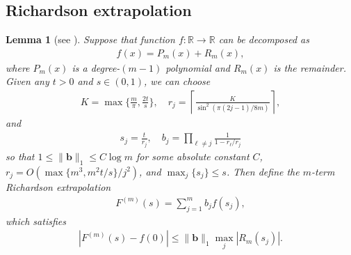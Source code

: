 \documentclass[11pt]{article}
\newtheorem{lemma}{Lemma}
\newcommand{\mb}{\mathbb}
\begin{document}
\subsection{Richardson extrapolation}

\begin{lemma}[{see \cite[Lemma A.9]{wang2025randomized}}]
\label{lem:richardson-extrapolation}
    Suppose that function $f\colon \mb R \to \mathbb{R}$ can be decomposed as 
    \begin{align*}
        f(x) = P_m(x)+R_m(x),
    \end{align*} 
    where $P_m(x)$ is a degree-$(m-1)$ polynomial and $R_m(x)$ is the remainder. Given any $t > 0$ and $s\in (0,1)$, we can choose 
    \begin{align*}
        K = \max\Big\{\frac{m}{\pi}, \frac{2t}{s}\Big\}, \quad r_j =\left\lceil \frac{K}{\sin^2(\pi(2j-1)/8m)}\right\rceil,
    \end{align*}
    and
    \begin{align*}
        s_j = \frac{t}{r_j}, \quad b_j=\prod_{\ell \neq j} \frac{1}{1-r_\ell/r_j}
    \end{align*}
    so that $1\le \|\mathbf{b}\|_1 \le C\log m$ for some absolute constant $C$, $r_j=O(\max\{m^3, m^2t/s\}/j^2)$, and $\max_{j}\{ s_j \}\le s$. Then define the $m$-term Richardson extrapolation \begin{align}
        \label{eq_richardson extrapolation}
        F^{(m)}(s)=\sum_{j=1}^m b_j f(s_j),
    \end{align}
    which satisfies \begin{align}
    \label{eq:error-F}
        |F^{(m)}(s)-f(0)|\le \|\mathbf{b}\|_1 \max_j|R_{m}(s_j)|.
    \end{align}
\end{lemma}
\end{document}
